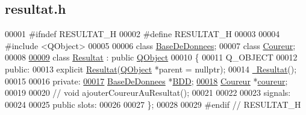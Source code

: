 \hypertarget{resultat_8h_source}{}\subsection{resultat.\+h}
\label{resultat_8h_source}

\begin{DoxyCode}
00001 \textcolor{preprocessor}{#ifndef RESULTAT\_H}
00002 \textcolor{preprocessor}{#define RESULTAT\_H}
00003 
00004 \textcolor{preprocessor}{#include <QObject>}
00005 
00006 \textcolor{keyword}{class }\hyperlink{class_base_de_donnees}{BaseDeDonnees};
00007 \textcolor{keyword}{class }\hyperlink{class_coureur}{Coureur};
00008 
\hyperlink{class_resultat}{00009} \textcolor{keyword}{class }\hyperlink{class_resultat}{Resultat} : \textcolor{keyword}{public} \hyperlink{class_q_object}{QObject}
00010 \{
00011     Q\_OBJECT
00012 \textcolor{keyword}{public}:
00013     \textcolor{keyword}{explicit} \hyperlink{class_resultat_a57e458f7abfc7463786ae9212bf55cd5}{Resultat}(\hyperlink{class_q_object}{QObject} *parent = \textcolor{keyword}{nullptr});
00014     \hyperlink{class_resultat_ae159333a3c5b89b8f307086bac618d7c}{~Resultat}();
00015 
00016 \textcolor{keyword}{private}:
\hyperlink{class_resultat_a25f2253e282cbedcd012c8496e219d86}{00017}     \hyperlink{class_base_de_donnees}{BaseDeDonnees} *\hyperlink{class_resultat_a25f2253e282cbedcd012c8496e219d86}{BDD};  
\hyperlink{class_resultat_a89183a87b7855a9b7e3b628e2f689982}{00018}     \hyperlink{class_coureur}{Coureur} *\hyperlink{class_resultat_a89183a87b7855a9b7e3b628e2f689982}{coureur}; 
00019 
00020     \textcolor{comment}{// void ajouterCoureurAuResultat();}
00021 
00022 
00023 signals:
00024 
00025 \textcolor{keyword}{public} slots:
00026 
00027 \};
00028 
00029 \textcolor{preprocessor}{#endif // RESULTAT\_H}
\end{DoxyCode}
